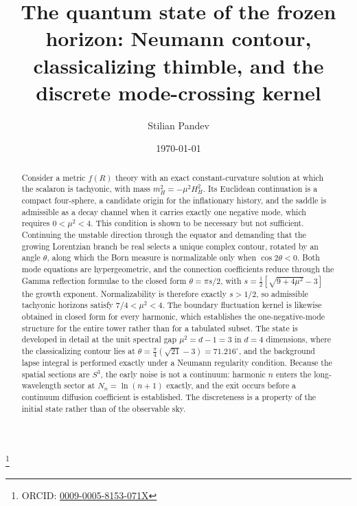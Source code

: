 \documentclass[aps,prd,twocolumn,superscriptaddress,nofootinbib,longbibliography]{revtex4-2}
\begin{document}
\title{The quantum state of the frozen horizon: Neumann contour,
classicalizing thimble, and the discrete mode-crossing kernel}

\author{Stilian Pandev}
\thanks{ORCID: \href{https://orcid.org/0009-0005-8153-071X}{0009-0005-8153-071X}}

\date{\today}

\begin{abstract}
Consider a metric $f(R)$ theory with an exact constant-curvature solution at
which the scalaron is tachyonic, with mass $m_H^2=-\mu^2H_H^2$. Its Euclidean
continuation is a compact four-sphere, a candidate origin for the
inflationary history, and the saddle is admissible as a decay channel when it
carries exactly one negative mode, which requires $0<\mu^2<4$. This condition
is shown to be necessary but not sufficient. Continuing the unstable
direction through the equator and demanding that the growing Lorentzian
branch be real selects a unique complex contour, rotated by an angle
$\theta$, along which the Born measure is normalizable only when
$\cos2\theta<0$. Both mode equations are hypergeometric, and the connection
coefficients reduce through the Gamma reflection formulae to the closed form
$\theta=\pi s/2$, with $s=\tfrac12[\sqrt{9+4\mu^2}-3]$ the growth exponent.
Normalizability is therefore exactly $s>1/2$, so admissible tachyonic
horizons satisfy $7/4<\mu^2<4$. The boundary fluctuation kernel is likewise
obtained in closed form for every harmonic, which establishes the
one-negative-mode structure for the entire tower rather than for a tabulated
subset. The state is developed in detail at the unit spectral gap
$\mu^2=d-1=3$ in $d=4$ dimensions, where the classicalizing contour lies at
$\theta=\tfrac{\pi}{4}(\sqrt{21}-3)=71.216^\circ$, and the background lapse
integral is performed exactly under a Neumann regularity condition. Because
the spatial sections are $S^3$, the early noise is not a continuum: harmonic
$n$ enters the long-wavelength sector at $N_n=\ln(n+1)$ exactly, and the exit
occurs before a continuum diffusion coefficient is established. The
discreteness is a property of the initial state rather than of the observable
sky.
\end{abstract}

\maketitle
\end{document}
